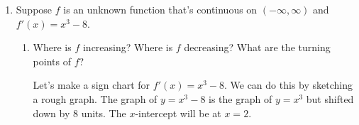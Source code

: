 \documentclass{article}
\begin{document}
\begin{enumerate}
\begin{enumerate}
\begin{solution}
      \begin{center}
      \end{center}

     Note that we don't know where the $x$-intercept(s) or $y$-intercept actually are.

     Now let's revise our graph to represent the information we found in part (c). We know that $f$ should
     be concave up on $(0, \infty)$. 
     \begin{center}
      \end{center}
      
    \end{solution}

  \end{enumerate}

\item  

  Suppose $f$ is an unknown function that's continuous on $(-\infty, \infty)$ and $f'(x) = x^3 - 8$.

  \begin{enumerate}
  \item

    \begin{problem}[\vfill]
      Where is $f$ increasing? Where is $f$ decreasing? What are the turning points of $f$? 
    \end{problem}

    \begin{solution}
      Let's make a sign chart for $f'(x)=x^3-8$. We can do this by sketching a rough graph. The graph
      of $y=x^3-8$ is the graph of $y=x^3$ but shifted down by 8 units. The $x$-intercept will be at $x=2$.

      \begin{center}
      \end{center}


\end{solution}
\end{enumerate}
\end{enumerate}
\end{document}
